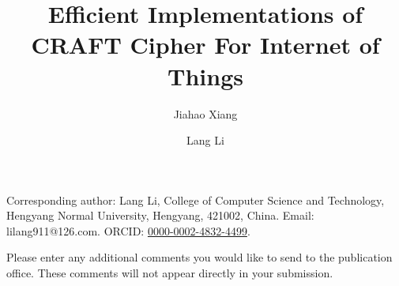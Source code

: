 \documentclass[12pt]{article}
\begin{document}
\title{Efficient Implementations of CRAFT Cipher For Internet of Things}
\author[1,2]{Jiahao Xiang}
\author[1,2]{Lang Li}

\maketitle

Corresponding author: Lang Li, College of Computer Science and Technology, Hengyang Normal University, Hengyang, 421002, China. Email: lilang911@126.com. ORCID: \href{https://orcid.org/0000-0002-4832-4499}{0000-0002-4832-4499}.

Please enter any additional comments you would like to send to the publication office. These comments will not appear directly in your submission.



\pagestyle{empty}
\end{document}
